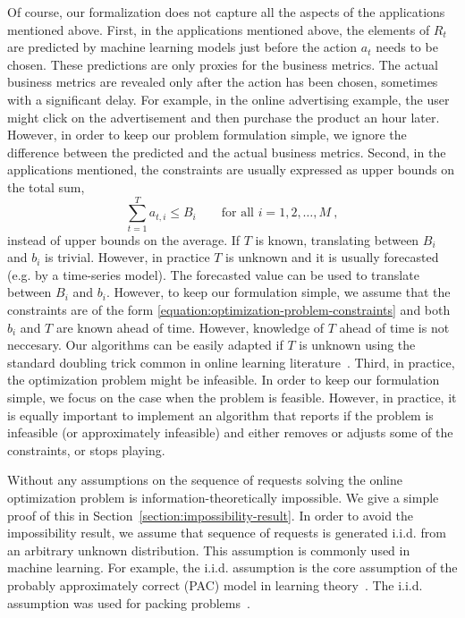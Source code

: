 \documentclass[12pt]{article}
\theoremstyle{definition}
\begin{document}
Of course, our formalization does not capture all the aspects of the
applications mentioned above. First, in the applications mentioned above, the
elements of $R_t$ are predicted by machine learning models just before the
action $a_t$ needs to be chosen. These predictions are only proxies for the
business metrics. The actual business metrics are revealed only after the action
has been chosen, sometimes with a significant delay. For example, in
the online advertising example, the user might click on the advertisement and
then purchase the product an hour later. However, in order to keep our problem
formulation simple, we ignore the difference between the predicted and the
actual business metrics. Second, in the applications mentioned, the constraints
are usually expressed as upper bounds on the total sum,
$$
\sum_{t=1}^T a_{t,i} \le B_i \qquad \text{for all $i=1,2,\dots,M$} \: ,
$$
instead of upper bounds on the average. If $T$ is known, translating between
$B_i$ and $b_i$ is trivial. However, in practice $T$ is unknown and it is
usually forecasted (e.g. by a time-series model). The forecasted value can be
used to translate between $B_i$ and $b_i$. However, to keep our formulation
simple, we assume that the constraints are of the form
\eqref{equation:optimization-problem-constraints} and both $b_i$ and $T$ are
known ahead of time. However, knowledge of $T$ ahead of time is not neccesary.
Our algorithms can be easily adapted if $T$ is unknown using the standard
doubling trick common in online learning literature~\cite[Section
2.3.1]{Shalev-Shwartz-2012}. Third, in practice, the optimization problem might
be infeasible. In order to keep our formulation simple, we focus on the case
when the problem is feasible. However, in practice, it is equally important to
implement an algorithm that reports if the problem is infeasible (or
approximately infeasible) and either removes or adjusts some of the constraints,
or stops playing.

Without any assumptions on the sequence of requests solving the online
optimization problem is information-theoretically impossible. We give a simple
proof of this in Section~\ref{section:impossibility-result}. In order to avoid
the impossibility result, we assume that sequence of requests is generated
i.i.d. from an arbitrary unknown distribution. This assumption is commonly used
in machine learning. For example, the i.i.d. assumption is the core assumption
of the probably approximately correct (PAC) model in learning
theory~\cite[Chapter 3]{Shalev-Shwartz-Ben-David-2014}. The i.i.d. assumption
was used for packing problems~\cite{Balseiro-Lu-Mirrokni-2023}.
\end{document}
